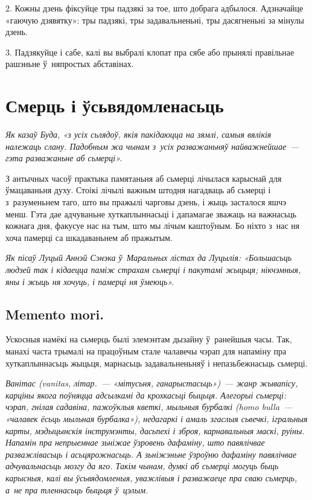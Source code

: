 2. Кожны дзень фіксуйце тры падзякі за тое, што добрага адбылося. Адзначайце «гаючую дзявятку»: тры падзякі, тры задавальненьні, тры дасягненьні за мінулы дзень.

3. Падзякуйце і сабе, калі вы выбралі клопат пра сябе або прынялі правільнае рашэньне ў~няпростых абставінах.


\section{Смерць і ўсьвядомленасьць}

\emph{Як казаў Буда, «з усіх сьлядоў, якія пакідаюцца на зямлі, самыя вялікія належаць слану. Падобным жа чынам з~усіх разважаньняў найважнейшае~--- гэта разважаньне аб сьмерці».}

З антычных часоў практыка памятаньня аб сьмерці лічылася карыснай для ўмацаваньня духу. Стоікі лічылі важным штодня нагадваць аб сьмерці і з~разуменьнем таго, што вы пражылі чарговы дзень, і жыць засталося яшчэ менш. Гэта дае адчуваньне хуткаплыннасьці і дапамагае зважаць на важнасьць кожнага дня, факусуе нас на тым, што мы лічым каштоўным. Бо ніхто з~нас ня хоча памерці са шкадаваньнем аб пражытым.

\emph{Як пісаў Луцый Аннэй Сэнэка ў~Маральных лістах да Луцылія: «Большасьць людзей так і кідаецца паміж страхам сьмерці і пакутамі жыцьця; нікчэмныя, яны і жыць ня хочуць, і памерці ня ўмеюць».}

\subsection*{Memento mori.}

Ускосныя намёкі на сьмерць былі элемэнтам дызайну ў~ранейшыя часы. Так, манахі часта трымалі на працоўным стале чалавечы чэрап для напаміну пра хуткаплыннасьць жыцьця, марнасьць задавальненьняў і непазьбежнасьць сьмерці. 

\emph{Ванітас (vanitas, літар.~--- «мітусьня, ганарыстасьць»)~--- жанр жывапісу, карціны якога поўняцца адсылкамі да крохкасьці быцьця. Алегорыі сьмерці: чэрап, гнілая садавіна, пажоўклыя кветкі, мыльныя бурбалкі (homo bulla~--- «чалавек ёсьць мыльная бурбалка»), недагаркі і амаль згаслыя сьвечкі, ігральныя карты, мэдыцынскія інструмэнты, дасьпехі і зброя, карнавальныя маскі, руіны. Напамін пра непрыемнае зьніжае ўзровень дафаміну, што павялічвае разважлівасьць і асьцярожнасьць. А зьніжэньне ўзроўню дафаміну павялічвае адчувальнасьць мозгу да яго. Такім чынам, думкі аб сьмерці могуць быць карысныя, калі вы ўсьвядомленыя, уважлівыя і разважаеце пра сваю сьмерць, а~не пра тленнасьць быцьця ў~цэлым.}

